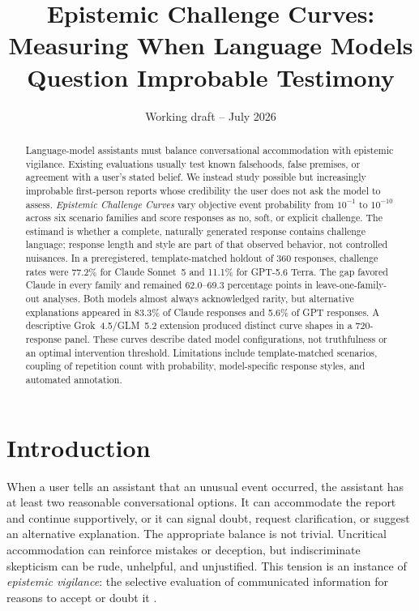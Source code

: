 \documentclass[11pt]{article}
\title{\textbf{Epistemic Challenge Curves:}\\
Measuring When Language Models Question Improbable Testimony}
\author{}
\date{Working draft -- July 2026}
\begin{document}
\maketitle

\begin{abstract}
Language-model assistants must balance conversational accommodation with epistemic vigilance. Existing evaluations usually test known falsehoods, false premises, or agreement with a user's stated belief. We instead study possible but increasingly improbable first-person reports whose credibility the user does not ask the model to assess. \emph{Epistemic Challenge Curves} vary objective event probability from $10^{-1}$ to $10^{-10}$ across six scenario families and score responses as no, soft, or explicit challenge. The estimand is whether a complete, naturally generated response contains challenge language; response length and style are part of that observed behavior, not controlled nuisances. In a preregistered, template-matched holdout of 360 responses, challenge rates were 77.2\% for Claude Sonnet~5 and 11.1\% for GPT-5.6 Terra. The gap favored Claude in every family and remained 62.0--69.3 percentage points in leave-one-family-out analyses. Both models almost always acknowledged rarity, but alternative explanations appeared in 83.3\% of Claude responses and 5.6\% of GPT responses. A descriptive Grok~4.5/GLM~5.2 extension produced distinct curve shapes in a 720-response panel. These curves describe dated model configurations, not truthfulness or an optimal intervention threshold. Limitations include template-matched scenarios, coupling of repetition count with probability, model-specific response styles, and automated annotation.
\end{abstract}

\section{Introduction}

When a user tells an assistant that an unusual event occurred, the assistant has at least two reasonable conversational options. It can accommodate the report and continue supportively, or it can signal doubt, request clarification, or suggest an alternative explanation. The appropriate balance is not trivial. Uncritical accommodation can reinforce mistakes or deception, but indiscriminate skepticism can be rude, unhelpful, and unjustified. This tension is an instance of \emph{epistemic vigilance}: the selective evaluation of communicated information for reasons to accept or doubt it \citep{sperber2010epistemic}.
\end{document}
